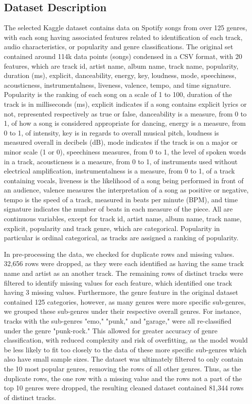 \documentclass[times, twocolumn]{article}
\begin{document}
\subsection{Dataset Description}
The selected Kaggle dataset contains data on Spotify songs from over 125 genres, with each song having associated features related to identification of each track, audio characteristics, or popularity and genre classifications. The original set contained around 114k data points (songs) condensed in a CSV format, with 20 features, which are track id, artist name, album name, track name, popularity, duration (ms), explicit, danceability, energy, key, loudness, mode, speechiness, acousticness, instrumentalness, liveness, valence, tempo, and time signature. Popularity is the ranking of each song on a scale of 1 to 100, duration of the track is in milliseconds (ms), explicit indicates if a song contains explicit lyrics or not, represented respectively as true or false, danceability is a measure, from 0 to 1, of how a song is considered appropriate for dancing, energy is a measure, from 0 to 1, of intensity, key is in regards to overall musical pitch, loudness is measured overall in decibels (dB), mode indicates if the track is on a major or minor scale (1 or 0), speechiness measures, from 0 to 1, the level of spoken words in a track, acousticness is a measure, from 0 to 1, of instruments used without electrical amplification, instrumentalness is a measure, from 0 to 1, of a track containing vocals, liveness is the likelihood of a song being performed in front of an audience, valence measures the interpretation of a song as positive or negative, tempo is the speed of a track, measured in beats per minute (BPM), and time signature indicates the number of beats in each measure of the piece. All are continuous variables, except for track id, artist name, album name, track name, explicit, popularity and track genre, which are categorical. Popularity in particular is ordinal categorical, as tracks are assigned a ranking of popularity. 

In pre-processing the data, we checked for duplicate rows and missing values. 32,656 rows were dropped, as they were each identified as having the same track name and artist as an another track. The remaining rows of distinct tracks were filtered to identify missing values for each feature, which identified one track having 3 missing values. Furthermore, the genre feature in the original dataset contained 125 categories, however, as many genres were more specific sub-genres, we grouped these sub-genres under their respective overall genres. For instance, tracks with the sub-genres "emo," "punk," and "garage," were all re-classified under the genre "punk-rock." This allowed for greater accuracy of genre classification, with reduced complexity and risk of overfitting, as the model would be less likely to fit too closely to the data of these more specific sub-genres which also have small sample sizes. The dataset was ultimately filtered to only contain the 10 most popular genres, removing the rows of all other genres. Thus, as the duplicate rows, the one row with a missing value and the rows not a part of the top 10 genres were dropped, the resulting cleaned dataset contained 81,344 rows of distinct tracks.
\end{document}

